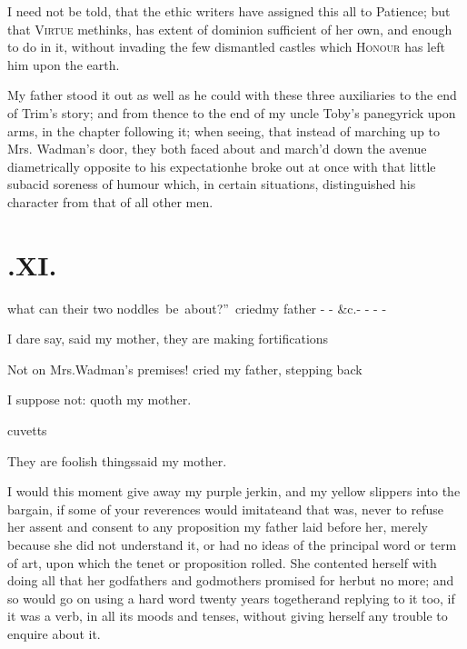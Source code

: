 \documentclass{article}
\begin{document}
I need not be told, that the ethic writers have assigned this all to Patience; but
that \textsc{Virtue} methinks, has extent of dominion sufficient of her own, and
enough to do in it, without invading the few dismantled castles which
\textsc{Honour} has left him upon the earth.

My father stood it out as well as he could with these three auxiliaries to the end
of Trim’s story; and from thence to the end of my uncle Toby’s panegyrick upon arms,
in the chapter following it; when seeing, that instead of marching up to Mrs.\@
Wadman’s door, they both faced about and march’d down the ave\-nue diametrically
opposite to his expectation\tsk he broke out at once with that little subacid soreness
of humour which, in certain situations, distinguished his cha\-racter from that of
all other men.

\vfill{}\eject
\null{}\baselineskip
\section{.\enspace XI.}

\nobreak
\enspace what can their two\break
\hbox{noddles be about?” cried}\break my father - - \&c.\@ - - - -

I dare say, said my mother, they are making
fortifications\tsh

\tsh Not on Mrs.\@ Wadman’s premises! cried
my father, stepping back\tsh

I suppose not: quoth my mother.

\break
{}
cuvetts\tsh

\tsh They are foolish things\tsh said my
mother.

\noindent
{}
I would this moment give
away my purple jerkin, and my yellow slippers into the bargain, if
some of your reverences would imitate\tsk and that was, never to
refuse her assent and consent to any proposition my father laid
before her, merely because she did not understand it, or had no ideas of the principal word or term of art,
upon which the tenet or proposition rolled. She contented herself
with doing all that her godfathers and godmothers promised for
her\tsk but no more; and so would go on using a hard word twenty
years together\tsk and replying to it too, if it was a verb, in
all its moods and tenses, without giving herself any trouble to
enquire about it.
\end{document}
